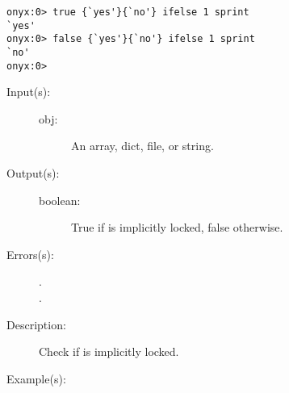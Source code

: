 \begin{description}
\begin{description}
\begin{verbatim}
onyx:0> true {`yes'}{`no'} ifelse 1 sprint
`yes'
onyx:0> false {`yes'}{`no'} ifelse 1 sprint
`no'
onyx:0>
		\end{verbatim}
	\end{description}
\label{systemdict:ilocked}
\item[{\onyxop{obj}{ilocked}{boolean}}: ]
	\begin{description}\item[]
	\item[Input(s): ]
		\begin{description}\item[]
		\item[obj: ]
			An array, dict, file, or string.
		\end{description}
	\item[Output(s): ]
		\begin{description}\item[]
		\item[boolean: ]
			True if  is implicitly locked, false
			otherwise.
		\end{description}
	\item[Errors(s): ]
		\begin{description}\item[]
		\item[.]
		\item[.]
		\end{description}
	\item[Description: ]
		Check if  is implicitly locked.
	\item[Example(s): ]\begin{verbatim}


\end{verbatim}
\end{description}
\end{description}

